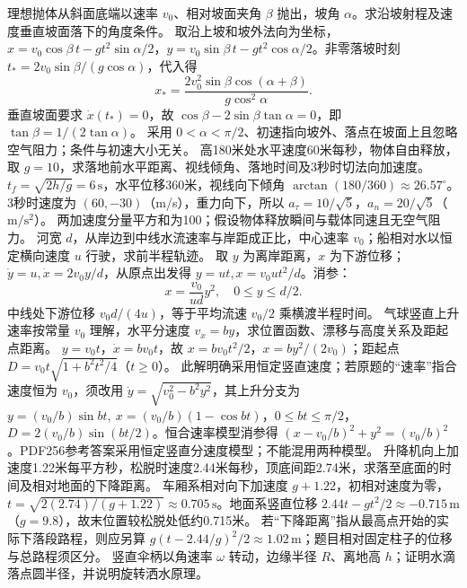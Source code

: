 \problemtext 理想抛体从斜面底端以速率 $v_0$、相对坡面夹角 $\beta$ 抛出，坡角 $\alpha$。求沿坡射程及速度垂直坡面落下的角度条件。
\workings 取沿上坡和坡外法向为坐标，$x=v_0\cos\beta\,t-gt^2\sin\alpha/2$，$y=v_0\sin\beta\,t-gt^2\cos\alpha/2$。非零落坡时刻 $t_*=2v_0\sin\beta/(g\cos\alpha)$，代入得
\[
x_*=\frac{2v_0^2\sin\beta\cos(\alpha+\beta)}{g\cos^2\alpha}.
\]
垂直坡面要求 $\dot x(t_*)=0$，故 $\cos\beta-2\sin\beta\tan\alpha=0$，即 $\tan\beta=1/(2\tan\alpha)$。
\crosscheck 采用 $0<\alpha<\pi/2$、初速指向坡外、落点在坡面上且忽略空气阻力；条件与初速大小无关。
\problemtext 高180米处水平速度60米每秒，物体自由释放，取 $g=10$，求落地前水平距离、视线倾角、落地时间及3秒时切法向加速度。
\workings $t_f=\sqrt{2h/g}=6\,\mathrm s$，水平位移360米，视线向下倾角 $\arctan(180/360)\approx26.57^\circ$。3秒时速度为 $(60,-30)$（m/s），重力向下，所以 $a_\tau=10/\sqrt5$，$a_n=20/\sqrt5$（$\mathrm{m/s^2}$）。
\crosscheck 两加速度分量平方和为100；假设物体释放瞬间与载体同速且无空气阻力。
\problemtext 河宽 $d$，从岸边到中线水流速率与岸距成正比，中心速率 $v_0$；船相对水以恒定横向速度 $u$ 行驶，求前半程轨迹。
\workings 取 $y$ 为离岸距离，$x$ 为下游位移；$\dot y=u,\dot x=2v_0y/d$，从原点出发得 $y=ut,x=v_0ut^2/d$。消参：
\[
x=\frac{v_0}{ud}y^2,\quad 0\le y\le d/2.
\]
\crosscheck 中线处下游位移 $v_0d/(4u)$，等于平均流速 $v_0/2$ 乘横渡半程时间。
\problemtext 气球竖直上升速率按常量 $v_0$ 理解，水平分速度 $v_x=by$，求位置函数、漂移与高度关系及距起点距离。
\workings $y=v_0t$，$\dot x=bv_0t$，故 $x=bv_0t^2/2$，$x=by^2/(2v_0)$；距起点 $D=v_0t\sqrt{1+b^2t^2/4}$（$t\ge0$）。
\crosscheck 此解明确采用恒定竖直速度；若原题的“速率”指合速度恒为 $v_0$，须改用 $\dot y=\sqrt{v_0^2-b^2y^2}$，其上升分支为 $y=(v_0/b)\sin bt,\ x=(v_0/b)(1-\cos bt)$，$0\le bt\le\pi/2$，$D=2(v_0/b)\sin(bt/2)$。恒合速率模型消参得 $(x-v_0/b)^2+y^2=(v_0/b)^2$。PDF256参考答案采用恒定竖直分速度模型；不能混用两种模型。
\problemtext 升降机向上加速度1.22米每平方秒，松脱时速度2.44米每秒，顶底间距2.74米，求落至底面的时间及相对地面的下降距离。
\workings 车厢系相对向下加速度 $g+1.22$，初相对速度为零，$t=\sqrt{2(2.74)/(g+1.22)}\approx0.705\,\mathrm s$。地面系竖直位移 $2.44t-gt^2/2\approx-0.715\,\mathrm m$（$g=9.8$），故末位置较松脱处低约0.715米。
\crosscheck 若“下降距离”指从最高点开始的实际下落段路程，则应另算 $g(t-2.44/g)^2/2\approx1.02\,\mathrm m$；题目相对固定柱子的位移与总路程须区分。
\problemtext 竖直伞柄以角速率 $\omega$ 转动，边缘半径 $R$、离地高 $h$；证明水滴落点圆半径，并说明旋转洒水原理。
